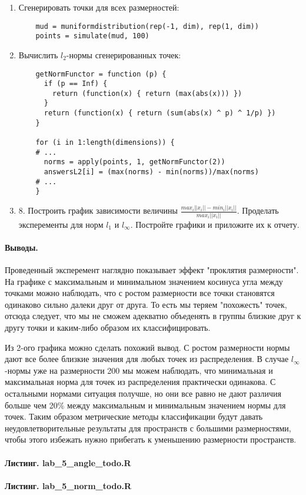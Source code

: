 \documentclass[12pt]{article}
\begin{document}
\begin{enumerate}
    \item Сгенерировать точки для всех размерностей:
    \begin{verbatim}
    mud = muniformdistribution(rep(-1, dim), rep(1, dim))
    points = simulate(mud, 100)
    \end{verbatim}

    \item Вычислить $ l_2 $-нормы сгенерированных точек:
    \begin{verbatim}
    getNormFunctor = function (p) {
      if (p == Inf) {
        return (function(x) { return (max(abs(x))) })
      }
      return (function(x) { return (sum(abs(x) ^ p) ^ 1/p) })
    }

    for (i in 1:length(dimensions)) {
    # ...
      norms = apply(points, 1, getNormFunctor(2))
      answersL2[i] = (max(norms) - min(norms))/max(norms)
    # ...
    }
    \end{verbatim}

    \item 8. Построить график зависимости величины $ \frac{max_i||x_i|| - min_i||x_i||}{max_i||x_i||} $.
          Проделать эксперементы для норм $ l_1 $ и $ l_{\infty} $. Постройте графики и приложите их к
          отчету.
    \begin{center}
    \end{center}
\end{enumerate}

\paragraph{Выводы.} Проведенный эксперемент наглядно показывает эффект
"проклятия размерности". На графике с максимальным и минимальном
значением косинуса угла между точками можно наблюдать, что с ростом размерности
все точки становятся одинаково сильно далеки друг от друга. То есть мы теряем
"похожесть" точек, отсюда следует, что мы не сможем адекватно объеденять в группы
близкие друг к другу точки и каким-либо образом их классифицировать.

Из 2-ого графика можно сделать похожий вывод. С ростом размерности нормы дают
все более близкие значения для любых точек из распределения. В случае
$ l_{\infty} $-нормы уже на размерности 200 мы можем наблюдать, что
минимальная и максимальная норма для точек из распределения практически
одинакова. С остальными нормами ситуация получше, но они все равно не дают
различия больше чем 20\% между максимальным и минимальным значением нормы для
точек. Таким образом метрические методы классификации будут давать
неудовлетворительные результаты для пространств с большими размерностями, чтобы
этого избежать нужно прибегать к уменьшению размерности пространств.


\paragraph{Листинг. lab\_5\_angle\_todo.R}
\begingroup
    \fontsize{10pt}{12pt}\selectfont
    
\endgroup
\paragraph{Листинг. lab\_5\_norm\_todo.R}
\begingroup
    \fontsize{10pt}{12pt}\selectfont
    
\endgroup
\end{document}
